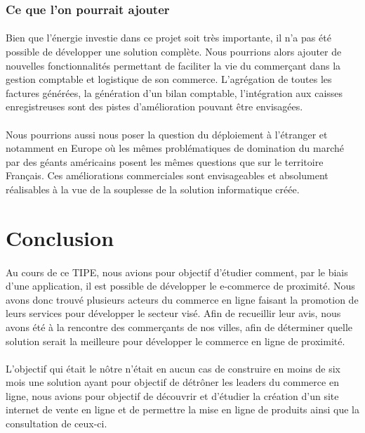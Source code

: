 \documentclass[a4paper, 12pt]{article}
\begin{document}
\subsubsection{Ce que l'on pourrait ajouter}

\paragraph{}Bien que l’énergie investie dans ce projet soit très importante, il n’a pas été possible de développer une solution complète. Nous pourrions alors ajouter de nouvelles fonctionnalités permettant de faciliter la vie du commerçant dans la gestion comptable et logistique de son commerce. L’agrégation de toutes les factures générées, la génération d’un bilan comptable, l’intégration aux caisses enregistreuses sont des pistes d’amélioration pouvant être envisagées.
\paragraph{}Nous pourrions aussi nous poser la question du déploiement à l’étranger et notamment en Europe où les mêmes problématiques de domination du marché par des géants américains posent les mêmes questions que sur le territoire Français. Ces améliorations commerciales sont envisageables et absolument réalisables à la vue de la souplesse de la solution informatique créée.


\newpage
\section{Conclusion}

\paragraph{}Au cours de ce TIPE, nous avions pour objectif d’étudier comment, par le biais d’une application, il est possible de développer le e-commerce de proximité. Nous avons donc trouvé plusieurs acteurs du commerce en ligne faisant la promotion de leurs services pour développer le secteur visé. Afin de recueillir leur avis, nous avons été à la rencontre des commerçants de nos villes, afin de déterminer quelle solution serait la meilleure pour développer le commerce en ligne de proximité.
\paragraph{}L’objectif qui était le nôtre n’était en aucun cas de construire en moins de six mois une solution ayant pour objectif de détrôner les leaders du commerce en ligne, nous avions pour objectif de découvrir et d’étudier la création d’un site internet de vente en ligne et de permettre la mise en ligne de produits ainsi que la consultation de ceux-ci.
\end{document}
